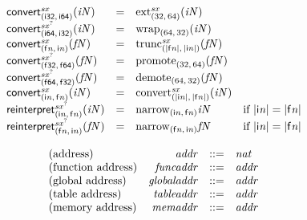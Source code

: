 $$
\begin{array}{@{}lcl@{}l@{}}
{{\mathsf{convert}}{{{}_{(\mathsf{i{\scriptstyle32}},\, \mathsf{i{\scriptstyle64}})}^{{\mathit{sx}}}}}}{({\mathit{iN}})} &=& {{{{\mathrm{ext}}}_{(32,\, 64)}^{{\mathit{sx}}}}}{({\mathit{iN}})} &  \\
{{\mathsf{convert}}{{{}_{(\mathsf{i{\scriptstyle64}},\, \mathsf{i{\scriptstyle32}})}^{{{\mathit{sx}}^?}}}}}{({\mathit{iN}})} &=& {{{\mathrm{wrap}}}_{(64,\, 32)}}{({\mathit{iN}})} &  \\
{{\mathsf{convert}}{{{}_{({\mathsf{f}}{{\mathit{n}}},\, {\mathsf{i}}{{\mathit{n}}})}^{{\mathit{sx}}}}}}{({\mathit{fN}})} &=& {{{{\mathrm{trunc}}}_{({|{\mathsf{f}}{{\mathit{n}}}|},\, {|{\mathsf{i}}{{\mathit{n}}}|})}^{{\mathit{sx}}}}}{({\mathit{fN}})} &  \\
{{\mathsf{convert}}{{{}_{(\mathsf{f{\scriptstyle32}},\, \mathsf{f{\scriptstyle64}})}^{{{\mathit{sx}}^?}}}}}{({\mathit{fN}})} &=& {{{\mathrm{promote}}}_{(32,\, 64)}}{({\mathit{fN}})} &  \\
{{\mathsf{convert}}{{{}_{(\mathsf{f{\scriptstyle64}},\, \mathsf{f{\scriptstyle32}})}^{{{\mathit{sx}}^?}}}}}{({\mathit{fN}})} &=& {{{\mathrm{demote}}}_{(64,\, 32)}}{({\mathit{fN}})} &  \\
{{\mathsf{convert}}{{{}_{({\mathsf{i}}{{\mathit{n}}},\, {\mathsf{f}}{{\mathit{n}}})}^{{\mathit{sx}}}}}}{({\mathit{iN}})} &=& {{{{\mathrm{convert}}}_{({|{\mathsf{i}}{{\mathit{n}}}|},\, {|{\mathsf{f}}{{\mathit{n}}}|})}^{{\mathit{sx}}}}}{({\mathit{iN}})} &  \\
{{\mathsf{reinterpret}}{{{}_{({\mathsf{i}}{{\mathit{n}}},\, {\mathsf{f}}{{\mathit{n}}})}^{{{\mathit{sx}}^?}}}}}{({\mathit{iN}})} &=& {{{\mathrm{narrow}}}_{({\mathsf{i}}{{\mathit{n}}},\, {\mathsf{f}}{{\mathit{n}}})}}{{\mathit{iN}}} &\quad
  \mbox{if}~{|{\mathsf{i}}{{\mathit{n}}}|} = {|{\mathsf{f}}{{\mathit{n}}}|} \\
{{\mathsf{reinterpret}}{{{}_{({\mathsf{f}}{{\mathit{n}}},\, {\mathsf{i}}{{\mathit{n}}})}^{{{\mathit{sx}}^?}}}}}{({\mathit{fN}})} &=& {{{\mathrm{narrow}}}_{({\mathsf{f}}{{\mathit{n}}},\, {\mathsf{i}}{{\mathit{n}}})}}{{\mathit{fN}}} &\quad
  \mbox{if}~{|{\mathsf{i}}{{\mathit{n}}}|} = {|{\mathsf{f}}{{\mathit{n}}}|} \\
\end{array}
$$

$$
\begin{array}{@{}lrrl@{}l@{}}
\mbox{(address)} & {\mathit{addr}} &::=& {\mathit{nat}} \\
\mbox{(function address)} & {\mathit{funcaddr}} &::=& {\mathit{addr}} \\
\mbox{(global address)} & {\mathit{globaladdr}} &::=& {\mathit{addr}} \\
\mbox{(table address)} & {\mathit{tableaddr}} &::=& {\mathit{addr}} \\
\mbox{(memory address)} & {\mathit{memaddr}} &::=& {\mathit{addr}} \\
\end{array}
$$

